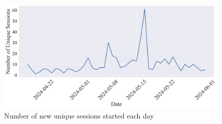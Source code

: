 \begin{figure}[H]
    \centering
    \includegraphics[width=1\textwidth]{results/plots/assets/usage-10-number-of-unique-sessions.png}
    \caption{Number of new unique sessions started each day}
    \label{fig:usage_10_number_of_unique_sessions}
\end{figure}